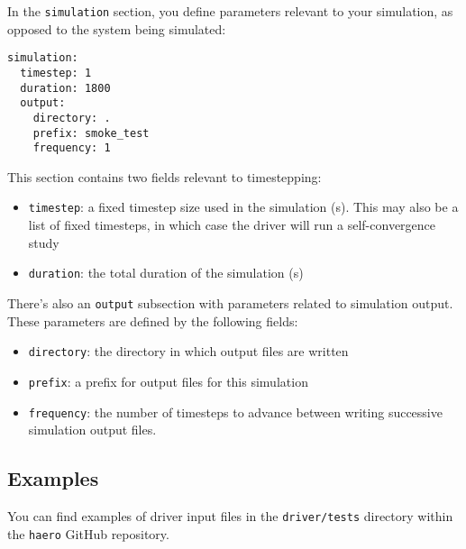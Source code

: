 In the \texttt{simulation} section, you define parameters relevant to your
simulation, as opposed to the system being simulated:

\begin{verbatim}
simulation:
  timestep: 1
  duration: 1800
  output:
    directory: .
    prefix: smoke_test
    frequency: 1
\end{verbatim}

This section contains two fields relevant to timestepping:

\begin{itemize}
  \item \texttt{timestep}: a fixed timestep size used in the simulation (s).
                         This may also be a list of fixed timesteps, in which
                         case the driver will run a self-convergence study
  \item \texttt{duration}: the total duration of the simulation (s)
\end{itemize}

There's also an \texttt{output} subsection with parameters related to simulation
output. These parameters are defined by the following fields:

\begin{itemize}
  \item \texttt{directory}: the directory in which output files are written
  \item \texttt{prefix}: a prefix for output files for this simulation
  \item \texttt{frequency}: the number of timesteps to advance between writing
                          successive simulation output files.
\end{itemize}

\subsection{Examples}

You can find examples of driver input files in the \texttt{driver/tests} directory
within the \texttt{haero} GitHub repository.
